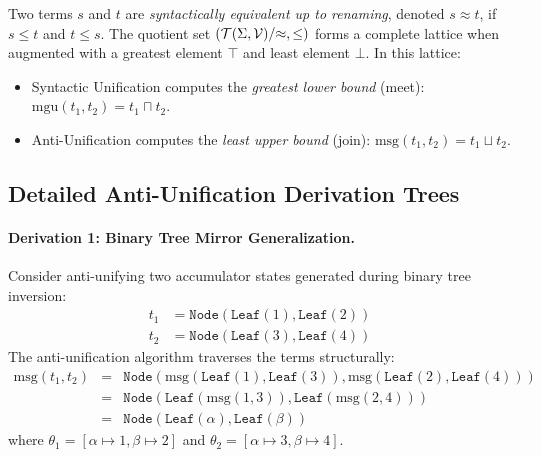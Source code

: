 Two terms $s$ and $t$ are \emph{syntactically equivalent up to renaming}, denoted $s \approx t$, if $s \le t$ and $t \le s$. The quotient set $(\mathcal{T}(\Sigma, \mathcal{V}) / {\approx}, \le)$ forms a complete lattice when augmented with a greatest element $\top$ and least element $\bot$. In this lattice:
\begin{itemize}
    \item Syntactic Unification computes the \emph{greatest lower bound} (meet): $\text{mgu}(t_1, t_2) = t_1 \sqcap t_2$.
    \item Anti-Unification computes the \emph{least upper bound} (join): $\text{msg}(t_1, t_2) = t_1 \sqcup t_2$.
\end{itemize}

\subsection{Detailed Anti-Unification Derivation Trees}

\paragraph{Derivation 1: Binary Tree Mirror Generalization.}
Consider anti-unifying two accumulator states generated during binary tree inversion:
\begin{align}
t_1 &= \mathtt{Node}(\mathtt{Leaf}(1), \mathtt{Leaf}(2)) \\
t_2 &= \mathtt{Node}(\mathtt{Leaf}(3), \mathtt{Leaf}(4))
\end{align}
The anti-unification algorithm traverses the terms structurally:
\begin{equation}
\begin{array}{rcl}
\text{msg}(t_1, t_2) &=& \mathtt{Node}(\text{msg}(\mathtt{Leaf}(1), \mathtt{Leaf}(3)), \text{msg}(\mathtt{Leaf}(2), \mathtt{Leaf}(4))) \\
&=& \mathtt{Node}(\mathtt{Leaf}(\text{msg}(1, 3)), \mathtt{Leaf}(\text{msg}(2, 4))) \\
&=& \mathtt{Node}(\mathtt{Leaf}(\alpha), \mathtt{Leaf}(\beta))
\end{array}
\end{equation}
where $\theta_1 = [\alpha \mapsto 1, \beta \mapsto 2]$ and $\theta_2 = [\alpha \mapsto 3, \beta \mapsto 4]$.

